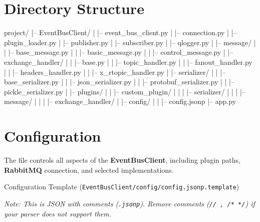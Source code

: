\section{Directory Structure}\label{sec:directory-structure}
\begin{pythonlog}
project/
|-- EventBusClient/
|   |-- event_bus_client.py
|   |-- connection.py
|   |-- plugin_loader.py
|   |-- publisher.py
|   |-- subscriber.py
|   |-- qlogger.py
|   |-- message/
|   |   |-- base_message.py
|   |   |-- basic_message.py
|   |   |-- control_message.py
|   |-- exchange_handler/
|   |   |-- base.py
|   |   |-- topic_handler.py
|   |   |-- fanout_handler.py
|   |   |-- headers_handler.py
|   |   |-- x_rtopic_handler.py
|   |-- serializer/
|   |   |-- base_serializer.py
|   |   |-- json_serializer.py
|   |   |-- protobuf_serializer.py
|   |   |-- pickle_serializer.py
|   |-- plugins/
|   |   |-- custom_plugin/
|   |   |   |-- serializer/
|   |   |   |-- message/
|   |   |   |-- exchange_handler/
|   |-- config/
|   |   |-- config.jsonp
|-- app.py
\end{pythonlog}

\newpage
\section{Configuration}\label{sec:configuration}
The  file controls all aspects of the \textbf{EventBusClient}, including plugin paths, \textbf{RabbitMQ} connection, and selected implementations.

Configuration Template (\texttt{EventBusClient/config/config.jsonp.template})

\noindent
\textit{Note: This is JSON with comments (\texttt{.jsonp}). Remove comments (\texttt{//~, /*~*/}) if your parser does not support them.}

